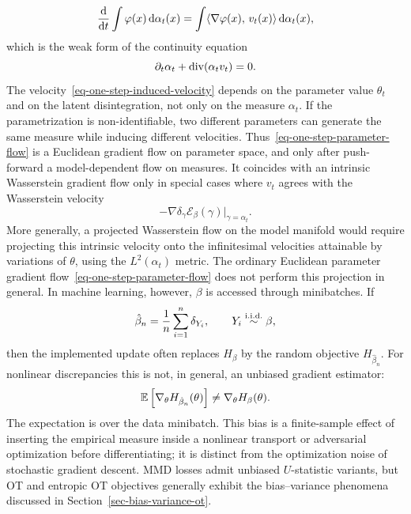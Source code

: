 \[
	\frac{\mathrm{d}}{\mathrm{d} t}\int \varphi(x)\,\mathrm{d}\alpha_t(x)
	=
	\int \langle \nabla\varphi(x),\,v_t(x)\rangle\,\mathrm{d}\alpha_t(x),
\]
which is the weak form of the continuity equation
\begin{equation}\label{eq-one-step-induced-continuity}
	\partial_t\alpha_t+\operatorname{div}(\alpha_t v_t)=0.
\end{equation}
The velocity~\eqref{eq-one-step-induced-velocity} depends on the parameter value $\theta_t$ and on the latent disintegration, not only on the measure $\alpha_t$. If the parametrization is non-identifiable, two different parameters can generate the same measure while inducing different velocities. Thus~\eqref{eq-one-step-parameter-flow} is a Euclidean gradient flow on parameter space, and only after push-forward a model-dependent flow on measures. It coincides with an intrinsic Wasserstein gradient flow only in special cases where $v_t$ agrees with the Wasserstein velocity
\[
	-\nabla\delta_\gamma\mathcal E_\beta(\gamma)\big|_{\gamma=\alpha_t}.
\]
More generally, a projected Wasserstein flow on the model manifold would require projecting this intrinsic velocity onto the infinitesimal velocities attainable by variations of $\theta$, using the $L^2(\alpha_t)$ metric. The ordinary Euclidean parameter gradient flow~\eqref{eq-one-step-parameter-flow} does not perform this projection in general.
In machine learning, however, $\beta$ is accessed through minibatches. If
\[
	\hat\beta_n=\frac{1}{n}\sum_{i=1}^n\delta_{Y_i},
	\qquad
	Y_i\overset{\mathrm{i.i.d.}}{\sim}\beta,
\]
then the implemented update often replaces $H_\beta$ by the random objective $H_{\hat\beta_n}$. For nonlinear discrepancies this is not, in general, an unbiased gradient estimator:
\[
	\mathbb{E}\left[\nabla_\theta H_{\hat\beta_n}(\theta)\right]
	\neq
	\nabla_\theta H_\beta(\theta).
\]
The expectation is over the data minibatch. This bias is a finite-sample effect of inserting the empirical measure inside a nonlinear transport or adversarial optimization before differentiating; it is distinct from the optimization noise of stochastic gradient descent. MMD losses admit unbiased $U$-statistic variants, but OT and entropic OT objectives generally exhibit the bias--variance phenomena discussed in Section~\ref{sec-bias-variance-ot}.

